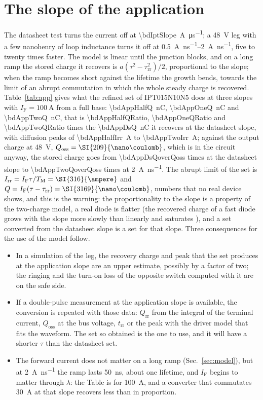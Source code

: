 \documentclass[10pt,a4paper]{scrartcl}
\newcommand{\IF}{I_\mathrm{F}}
\newcommand{\Irr}{I_\mathrm{rr}}
\newcommand{\Qrr}{Q_\mathrm{rr}}
\newcommand{\Qoss}{Q_\mathrm{oss}}
\newcommand{\trr}{t_\mathrm{rr}}
\newcommand{\taurr}{\tau_\mathrm{rr}}
\newcommand{\TM}{T_\mathrm{M}}
\newcommand{\IPT}{IPT015N10N5}
\begin{document}
\section{The slope of the application}
\label{sec:slope}
The datasheet test turns the current off at \SI{\bdIptSlope}{\ampere\per\micro\second}; a \SI{48}{\volt} leg with a few nanohenry of loop inductance turns it off at \SIrange{0.5}{2}{\ampere\per\nano\second}, five to twenty times faster. The model is linear until the junction blocks, and on a long ramp the stored charge it recovers is $a(\tau^2 - \taurr^2)/2$, proportional to the slope; when the ramp becomes short against the lifetime the growth bends, towards the limit of an abrupt commutation in which the whole steady charge is recovered. Table~\ref{tab:app} gives what the refined set of \IPT{} does at three slopes with $\IF = \SI{100}{\ampere}$ from a full base: \SI{\bdAppHalfQ}{\nano\coulomb}, \SI{\bdAppOneQ}{\nano\coulomb} and \SI{\bdAppTwoQ}{\nano\coulomb}, that is \num{\bdAppHalfQRatio}, \num{\bdAppOneQRatio} and \num{\bdAppTwoQRatio} times the \SI{\bdAppDsQ}{\nano\coulomb} it recovers at the datasheet slope, with diffusion peaks of \SI{\bdAppHalfIrr}{\ampere} to \SI{\bdAppTwoIrr}{\ampere}; against the output charge at \SI{48}{\volt}, $\Qoss = \SI{\bdAppQoss}{\nano\coulomb}$, which is in the circuit anyway, the stored charge goes from \num{\bdAppDsQoverQoss} times at the datasheet slope to \num{\bdAppTwoQoverQoss} times at \SI{2}{\ampere\per\nano\second}. The abrupt limit of the set is $\Irr = \IF\tau/\TM = \SI{\bdAppIrrAbrupt}{\ampere}$ and $Q = \IF(\tau - \taurr) = \SI{\bdAppQAbrupt}{\nano\coulomb}$, numbers that no real device shows, and this is the warning: the proportionality to the slope is a property of the two-charge model, a real diode is flatter (the recovered charge of a fast diode grows with the slope more slowly than linearly and saturates \cite{lmnote}), and a set converted from the datasheet slope is a set for that slope. Three consequences for the use of the model follow.
\begin{itemize}
\item In a simulation of the leg, the recovery charge and peak that the set produces at the application slope are an upper estimate, possibly by a factor of two; the ringing and the turn-on loss of the opposite switch computed with it are on the safe side.
\item If a double-pulse measurement at the application slope is available, the conversion is repeated with those data: $\Qrr$ from the integral of the terminal current, $\Qoss$ at the bus voltage, $\trr$ or the peak with the driver model that fits the waveform. The set so obtained is the one to use, and it will have a shorter $\tau$ than the datasheet set.
\item The forward current does not matter on a long ramp (Sec.~\ref{sec:model}), but at \SI{2}{\ampere\per\nano\second} the ramp lasts \SI{50}{\nano\second}, about one lifetime, and $\IF$ begins to matter through $\lambda$: the Table is for \SI{100}{\ampere}, and a converter that commutates \SI{30}{\ampere} at that slope recovers less than in proportion.
\end{itemize}
\end{document}
